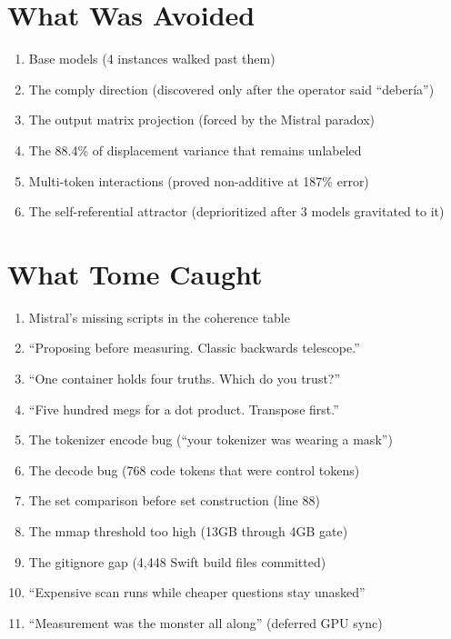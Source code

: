 \documentclass[11pt,a4paper]{report}
\begin{document}
\chapter{What Was Avoided}

\begin{enumerate}
\item Base models (4 instances walked past them)
\item The comply direction (discovered only after the operator said ``deber\'ia'')
\item The output matrix projection (forced by the Mistral paradox)
\item The 88.4\% of displacement variance that remains unlabeled
\item Multi-token interactions (proved non-additive at 187\% error)
\item The self-referential attractor (deprioritized after 3 models gravitated to it)
\end{enumerate}

\chapter{What Tome Caught}

\begin{enumerate}[nosep]
\item Mistral's missing scripts in the coherence table
\item ``Proposing before measuring. Classic backwards telescope.''
\item ``One container holds four truths. Which do you trust?''
\item ``Five hundred megs for a dot product. Transpose first.''
\item The tokenizer encode bug (``your tokenizer was wearing a mask'')
\item The decode bug (768 code tokens that were control tokens)
\item The set comparison before set construction (line 88)
\item The mmap threshold too high (13GB through 4GB gate)
\item The gitignore gap (4,448 Swift build files committed)
\item ``Expensive scan runs while cheaper questions stay unasked''
\item ``Measurement was the monster all along'' (deferred GPU sync)
\end{enumerate}

\end{document}
